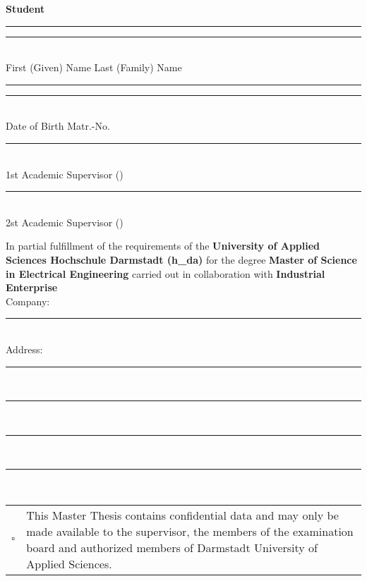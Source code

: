\thispagestyle{empty} 
\textbf{\Large Student}
\par \vspace{10mm}
\rule[0ex]{0.45\textwidth}{0.4pt} \hspace{14mm}
\rule[0ex]{0.45\textwidth}{0.4pt}\\
First (Given) Name \hspace{55mm}
Last (Family) Name
\par \vspace{10mm}

\rule[0ex]{0.45\textwidth}{0.4pt} \hspace{14mm}
\rule[0ex]{0.45\textwidth}{0.4pt}\\
Date of Birth \hspace{66mm}
Matr.-No.


\par \vspace{10mm}
\rule[0ex]{\textwidth}{0.4pt} \\
1st Academic Supervisor (\textit{\myProf})
\par \vspace{10mm}
\rule[0ex]{\textwidth}{0.4pt} \\
2st Academic Supervisor (\textit{\myOtherProf})


\par \vspace{15mm} 
In partial fulfillment of the requirements of the \textbf{University of Applied Sciences Hochschule Darmstadt (h\_da)} for the degree \textbf{Master of Science in Electrical Engineering} carried out in collaboration with \textbf{Industrial Enterprise}\\[1ex]

Company: \rule[0ex]{0.885\textwidth}{0.4pt}\\[2ex] 

Address: \rule[0ex]{0.9\textwidth}{0.4pt}\\[2ex]
\rule[0ex]{\textwidth}{0.4pt} \\[2ex]
\rule[0ex]{\textwidth}{0.4pt} \\[2ex]
\rule[0ex]{\textwidth}{0.4pt} \\[0ex]
\vspace{0.7cm}
\begin{table}[h]
	\begin{tabular}{lp{14.5cm}}
		$\square$ & This Master Thesis contains confidential data and may only be made available to the supervisor, the members of the examination board and authorized members of Darmstadt University of Applied Sciences.
	\end{tabular}
\end{table}